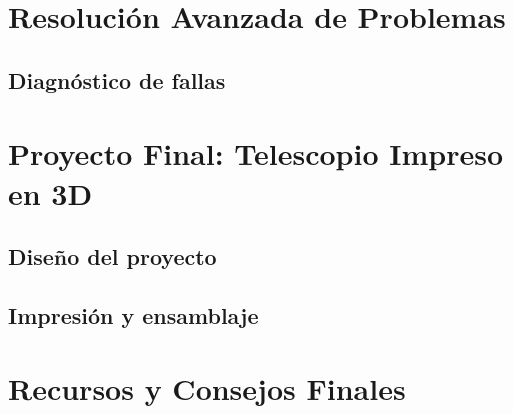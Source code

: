 \section{Resolución Avanzada de Problemas}

\subsection{Diagnóstico de fallas}


\section{Proyecto Final: Telescopio Impreso en 3D}

\subsection{Diseño del proyecto}

\subsection{Impresión y ensamblaje}

\section{Recursos y Consejos Finales}

